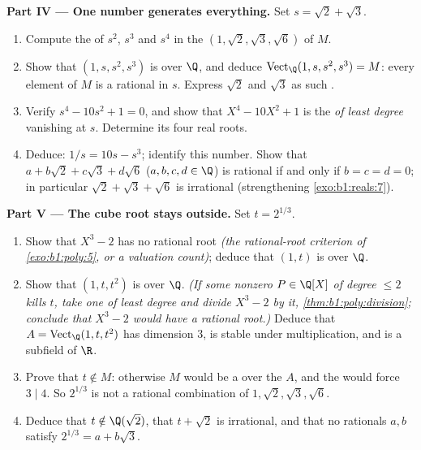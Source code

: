 \begin{problem}
\medskip
\noindent\textbf{Part IV --- One number generates everything.}
Set $s = \sqrt2 + \sqrt3$.
\begin{enumerate}[resume]
  \item Compute the  of $s^2$, $s^3$ and $s^4$ in the
         $(1, \sqrt2, \sqrt3, \sqrt6)$ of $M$.
  \item Show that $(1, s, s^2, s^3)$ is  over $\Q$, and deduce
        $\operatorname{Vect}_\Q(1, s, s^2, s^3) = M$: every
        element of $M$ is a rational  in $s$. Express
        $\sqrt2$ and $\sqrt3$ as such .
  \item Verify $s^4 - 10s^2 + 1 = 0$, and show that $X^4 - 10X^2
        + 1$ is the \emph{ of least degree}
        vanishing at $s$. Determine its four real roots.
  \item Deduce: $1/s = 10s - s^3$; identify this number. Show
        that $a + b\sqrt2 + c\sqrt3 + d\sqrt6$ ($a,b,c,d \in \Q$)
        is rational if and only if $b = c = d = 0$; in
        particular $\sqrt2 + \sqrt3 + \sqrt6$ is irrational
        (strengthening \cref{exo:b1:reals:7}).
\end{enumerate}

\medskip
\noindent\textbf{Part V --- The cube root stays outside.} Set $t
= 2^{1/3}$.
\begin{enumerate}[resume]
  \item Show that $X^3 - 2$ has no rational root \emph{(the
        rational-root criterion of \cref{exo:b1:poly:5}, or a
        valuation count)}; deduce that $(1, t)$ is  over
        $\Q$.
  \item Show that $(1, t, t^2)$ is  over $\Q$. \emph{(If some
        nonzero $P \in \Q[X]$ of degree $\leq 2$ kills $t$, take
        one of least degree and divide $X^3 - 2$ by it,
        \cref{thm:b1:poly:division}; conclude that $X^3 - 2$
        would have a rational root.)} Deduce that $A =
        \operatorname{Vect}_\Q(1, t, t^2)$ has dimension $3$, is
        stable under multiplication, and is a subfield of $\R$.
  \item Prove that $t \notin M$: otherwise $M$ would be a  over the  $A$, and the  would force
        $3 \mid 4$. So $2^{1/3}$ is not a rational combination
        of $1, \sqrt2, \sqrt3, \sqrt6$.
  \item Deduce that $t \notin \Q(\sqrt2)$, that $t + \sqrt2$ is
        irrational, and that no rationals $a, b$ satisfy
        $2^{1/3} = a + b\sqrt3$.
\end{enumerate}


\end{problem}
